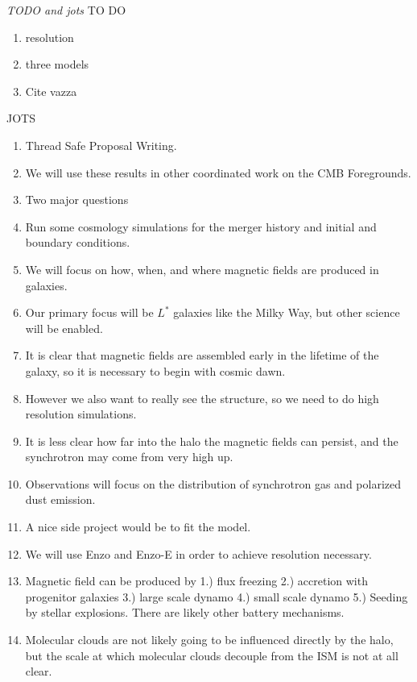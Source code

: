 \emph{TODO and jots}
TO DO
\begin{enumerate}
\item resolution
\item three models
\item Cite vazza
\end{enumerate}

JOTS
\begin{enumerate}
\item Thread Safe Proposal Writing.
\item We will use these results in other coordinated work on the CMB
Foregrounds.
\item Two major questions
\item Run some cosmology simulations for the merger history and initial and
boundary conditions.
\item We will focus on how, when, and where magnetic fields are produced in
galaxies.  
\item Our primary focus will be $L^*$ galaxies like the Milky Way, but other
science will be enabled.
\item It is clear that magnetic fields are assembled early in the lifetime of
the galaxy, so it is necessary to begin with cosmic dawn.
\item However we also want to really see the structure, so we need to do high
resolution simulations.
\item It is less clear how far into the halo the magnetic fields can persist,
and the synchrotron may come from very high up.
\item Observations will focus on the distribution of synchrotron gas and
polarized dust emission.
\item A nice side project would be to fit the \citet{Jansson12} model.
\item We will use Enzo and Enzo-E in order to achieve resolution necessary.
\item Magnetic field can be produced by 1.) flux freezing 2.) accretion with
progenitor galaxies 3.) large scale dynamo 4.) small scale dynamo 5.) Seeding by
stellar explosions.  There are likely other battery mechanisms.
\item Molecular clouds are not likely going to be influenced directly by the
halo, but the scale at which molecular clouds decouple from the ISM is not at
all clear.  
\end{enumerate}
